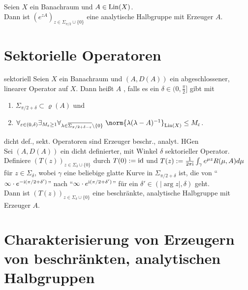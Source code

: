 \begin{Bsp}
    Seien $X$ ein Banachraum und $A \in \operatorname{Lin}(X)$.\\
    Dann ist $(e^{zA})_{z \in \Sigma_{\pi/2} \cup \{0\}}$ eine analytische Halbgruppe
    mit Erzeuger $A$.
\end{Bsp}

\section{%
    Sektorielle Operatoren%
}

\begin{Def}{sektoriell}
    Seien $X$ ein Banachraum und $(A, D(A))$ ein abgeschlossener, linearer Operator auf $X$.
    Dann heißt $A$ , falls
    es ein $\delta \in (0, \frac{\pi}{2}]$ gibt mit
    \begin{enumerate}
        \item
        $\Sigma_{\pi/2+\delta} \subset \varrho(A)$ und

        \item
        $\forall_{\varepsilon \in (0, \delta)} \exists_{M_\varepsilon \ge 1}
        \forall_{\lambda \in \overline{\Sigma_{\pi/2+\delta-\varepsilon}} \setminus \{0\}}\;
        \norm{\lambda (\lambda - A)^{-1}}_{\Lin(X)} \le M_\varepsilon$.
    \end{enumerate}
\end{Def}

\begin{Satz}{dicht def., sekt. Operatoren sind Erzeuger beschr., analyt. HGen}\\
    Sei $(A, D(A))$ ein dicht definierter, mit Winkel $\delta$ sektorieller Operator.\\
    Definiere $(T(z))_{z \in \Sigma_\delta \cup \{0\}}$ durch $T(0) := \text{id}$ und
    $T(z) := \frac{1}{2\pi\mathrm{i}} \int_\gamma e^{\mu z} R(\mu, A) d\mu$ für $z \in \Sigma_\delta$,
    wobei $\gamma$ eine beliebige glatte Kurve in $\Sigma_{\pi/2+\delta}$ ist,
    die von "`$\infty \cdot e^{-\mathrm{i}(\pi/2+\delta')}$"' nach
    "`$\infty \cdot e^{\mathrm{i}(\pi/2+\delta')}$"' für ein $\delta' \in (|\arg z|, \delta)$ geht.\\
    Dann ist $(T(z))_{z \in \Sigma_\delta \cup \{0\}}$ eine beschränkte, analytische Halbgruppe
    mit Erzeuger $A$.
\end{Satz}

\pagebreak

\section{%
    Charakterisierung von Erzeugern von beschränkten, analytischen Halbgruppen%
}

